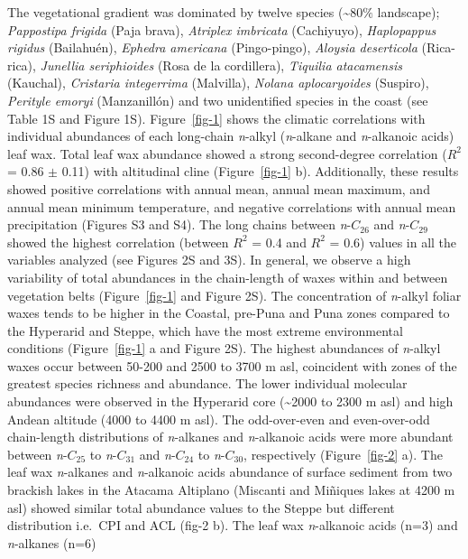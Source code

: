 \documentclass[
  authoryear,
  preprint,
  3p]{elsarticle}
\begin{document}
The vegetational gradient was dominated by twelve species
(\textasciitilde80\(\%\) landscape); \emph{Pappostipa frigida} (Paja
brava), \emph{Atriplex imbricata} (Cachiyuyo), \emph{Haplopappus
rigidus} (Bailahuén), \emph{Ephedra americana} (Pingo-pingo),
\emph{Aloysia deserticola} (Rica-rica), \emph{Junellia seriphioides}
(Rosa de la cordillera), \emph{Tiquilia atacamensis} (Kauchal),
\emph{Cristaria integerrima} (Malvilla), \emph{Nolana aplocaryoides}
(Suspiro), \emph{Perityle emoryi} (Manzanillón) and two unidentified
species in the coast (see Table 1S and Figure 1S). Figure~\ref{fig-1}
shows the climatic correlations with individual abundances of each
long-chain \emph{n}-alkyl (\emph{n}-alkane and \emph{n}-alkanoic acids)
leaf wax. Total leaf wax abundance showed a strong second-degree
correlation (\(R^{2}\)= 0.86 \(\pm\) 0.11) with altitudinal cline
(Figure~\ref{fig-1} b). Additionally, these results showed positive
correlations with annual mean, annual mean maximum, and annual mean
minimum temperature, and negative correlations with annual mean
precipitation (Figures S3 and S4). The long chains between
\emph{n}-\(C_{26}\) and \emph{n}-\(C_{29}\) showed the highest
correlation (between \(R^{2}\) = 0.4 and \(R^{2}\) = 0.6) values in all
the variables analyzed (see Figures 2S and 3S). In general, we observe a
high variability of total abundances in the chain-length of waxes within
and between vegetation belts (Figure~\ref{fig-1} and Figure 2S). The
concentration of \emph{n}-alkyl foliar waxes tends to be higher in the
Coastal, pre-Puna and Puna zones compared to the Hyperarid and Steppe,
which have the most extreme environmental conditions (Figure~\ref{fig-1}
a and Figure 2S). The highest abundances of \emph{n}-alkyl waxes occur
between 50-200 and 2500 to 3700 m asl, coincident with zones of the
greatest species richness and abundance. The lower individual molecular
abundances were observed in the Hyperarid core (\textasciitilde2000 to
2300 m asl) and high Andean altitude (4000 to 4400 m asl). The
odd-over-even and even-over-odd chain-length distributions of
\emph{n}-alkanes and \emph{n}-alkanoic acids were more abundant between
\emph{n}-\(C_{25}\) to \emph{n}-\(C_{31}\) and \emph{n}-\(C_{24}\) to
\emph{n}-\(C_{30}\), respectively (Figure~\ref{fig-2} a). The leaf wax
\emph{n}-alkanes and \emph{n}-alkanoic acids abundance of surface
sediment from two brackish lakes in the Atacama Altiplano (Miscanti and
Miñiques lakes at 4200 m asl) showed similar total abundance values to
the Steppe but different distribution i.e.~CPI and ACL (fig-2 b). The
leaf wax \emph{n}-alkanoic acids (n=3) and \emph{n}-alkanes (n=6)
\end{document}
